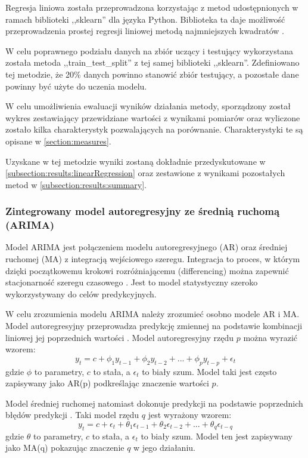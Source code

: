 \documentclass[10pt,a4paper]{article}
\begin{document}
Regresja liniowa została przeprowadzona korzystając z metod udostępnionych w ramach biblioteki ,,sklearn'' dla języka Python. Biblioteka ta daje możliwość przeprowadzenia prostej regresji liniowej metodą najmniejszych kwadratów \cite{sklearnLinearRegression}.

W celu poprawnego podziału danych na zbiór uczący i testujący wykorzystana została metoda ,,train\_test\_split'' z tej samej biblioteki ,,sklearn''. Zdefiniowano tej metodzie, że 20\% danych powinno stanowić zbiór testujący, a pozostałe dane powinny być użyte do uczenia modelu. 

W celu umożliwienia ewaluacji wyników działania metody, sporządzony został wykres zestawiający przewidziane wartości z wynikami pomiarów oraz wyliczone zostało kilka charakterystyk pozwalających na porównanie. Charakterystyki te są opisane w \autoref{section:measures}.

Uzyskane w tej metodzie wyniki zostaną dokładnie przedyskutowane w \autoref{subsection:results:linearRegression} oraz zestawione z wynikami pozostałych metod w \autoref{subsection:results:summary}.

\subsubsection{Zintegrowany model autoregresyjny ze średnią ruchomą (ARIMA)}
\label{subsection:arima}
Model ARIMA jest połączeniem modelu autoregresyjnego (AR) oraz średniej ruchomej (MA) z integracją wejściowego szeregu. Integracja to proces, w którym dzięki początkowemu krokowi rozróżniającemu (differencing) można zapewnić stacjonarność szeregu czasowego \cite{arima}. Jest to model statystyczny szeroko wykorzystywany do celów predykcyjnych. 

W celu zrozumienia modelu ARIMA należy zrozumieć osobno modele AR i MA. Model autoregresyjny przeprowadza predykcję zmiennej na podstawie kombinacji liniowej jej poprzednich wartości \cite{ar}. Model autoregresyjny rzędu $p$ można wyrazić wzorem: 
\begin{equation}
	y_t = c + \phi_1 y_{t-1} + \phi_2 y_{t-2} + ... + \phi_p y_{t-p} + \epsilon_t
	\label{equation:ar}
\end{equation}
gdzie $\phi$ to parametry, $c$ to stała, a $\epsilon_t$ to biały szum. Model taki jest często zapisywany jako AR(p) podkreślając znaczenie wartości $p$.

Model średniej ruchomej natomiast dokonuje predykcji na podstawie poprzednich błędów predykcji \cite{ma}. Taki model rzędu $q$ jest wyrażony wzorem:
\begin{equation}
	y_t = c + \epsilon_t + \theta_1\epsilon_{t-1} + \theta_2\epsilon_{t-2} + ... + \theta_q\epsilon_{t-q}
		\label{equation:ma}
\end{equation}
gdzie $\theta$ to parametry, $c$ to stała, a $\epsilon_t$ to biały szum.
Model ten jest zapisywany jako MA(q) pokazując znaczenie $q$ w jego działaniu. 
\end{document}
